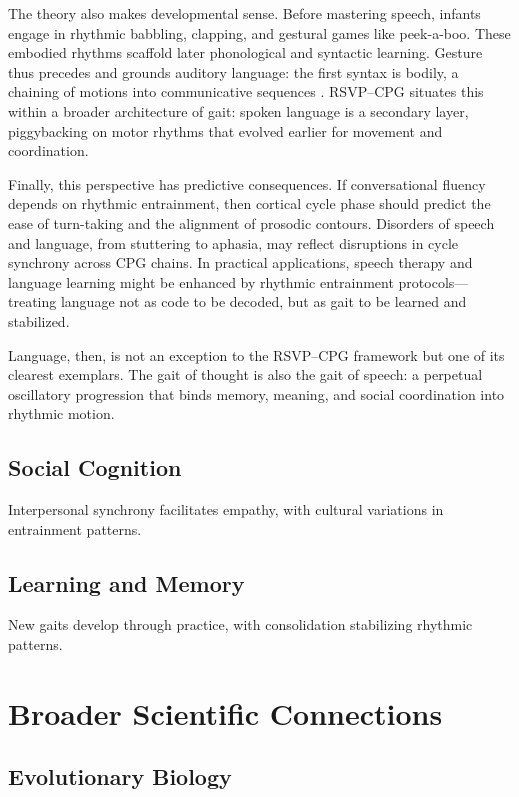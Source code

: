\documentclass{article}
\begin{document}
The theory also makes developmental sense. Before mastering speech, infants engage in rhythmic babbling, clapping, and gestural games like peek-a-boo. These embodied rhythms scaffold later phonological and syntactic learning. Gesture thus precedes and grounds auditory language: the first syntax is bodily, a chaining of motions into communicative sequences \citep{goldin2003language}. RSVP--CPG situates this within a broader architecture of gait: spoken language is a secondary layer, piggybacking on motor rhythms that evolved earlier for movement and coordination.

Finally, this perspective has predictive consequences. If conversational fluency depends on rhythmic entrainment, then cortical cycle phase should predict the ease of turn-taking and the alignment of prosodic contours. Disorders of speech and language, from stuttering to aphasia, may reflect disruptions in cycle synchrony across CPG chains. In practical applications, speech therapy and language learning might be enhanced by rhythmic entrainment protocols—treating language not as code to be decoded, but as gait to be learned and stabilized.

Language, then, is not an exception to the RSVP--CPG framework but one of its clearest exemplars. The gait of thought is also the gait of speech: a perpetual oscillatory progression that binds memory, meaning, and social coordination into rhythmic motion.


\subsection{Social Cognition}

Interpersonal synchrony facilitates empathy, with cultural variations in entrainment patterns.

\subsection{Learning and Memory}

New gaits develop through practice, with consolidation stabilizing rhythmic patterns.

\section{Broader Scientific Connections}

\subsection{Evolutionary Biology}
\end{document}
